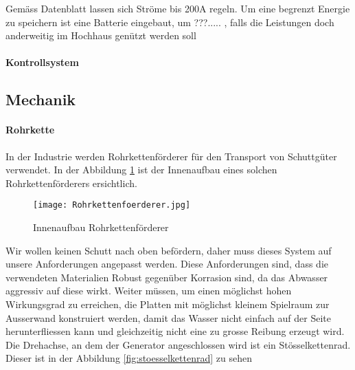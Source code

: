 Gemäss Datenblatt lassen sich Ströme bis 200A regeln. Um eine begrenzt Energie zu speichern ist eine Batterie eingebaut, um ???.....
, falls die Leistungen doch anderweitig im Hochhaus genützt werden soll %


\paragraph{Kontrollsystem}





\newpage


\subsection{Mechanik}

\paragraph{Rohrkette}

In der Industrie werden Rohrkettenförderer für den Transport von Schuttgüter verwendet. In der Abbildung \ref{fig:Rohrkettenfoerderer}  ist der Innenaufbau eines solchen Rohrkettenförderers ersichtlich.

\begin{figure} [H]
	\centering
	\texttt{[image: Rohrkettenfoerderer.jpg]}
	\caption{Innenaufbau Rohrkettenförderer \cite{abconvey}}
	\label{fig:Rohrkettenfoerderer}
\end{figure}

Wir wollen keinen Schutt nach oben befördern, daher muss dieses System auf unsere Anforderungen angepasst werden. Diese Anforderungen sind, dass die verwendeten Materialien Robust gegenüber Korrasion sind, da das Abwasser aggressiv auf diese wirkt. Weiter müssen, um einen möglichst hohen Wirkungsgrad zu erreichen, die Platten mit möglichst kleinem Spielraum zur Ausserwand konstruiert werden, damit das Wasser nicht einfach auf der Seite herunterfliessen kann und gleichzeitig nicht eine zu grosse Reibung erzeugt wird. Die Drehachse, an dem der Generator angeschlossen wird ist ein Stösselkettenrad. Dieser ist in der Abbildung \ref{fig:stoesselkettenrad}  zu sehen

